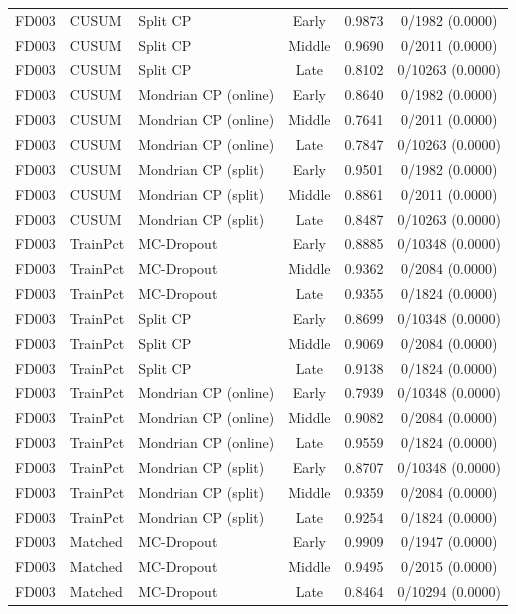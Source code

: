 \begin{table}[t]
\begin{tabular}{lllccc}
FD003 & CUSUM & Split CP & Early & 0.9873 & 0/1982 (0.0000) \\
FD003 & CUSUM & Split CP & Middle & 0.9690 & 0/2011 (0.0000) \\
FD003 & CUSUM & Split CP & Late & 0.8102 & 0/10263 (0.0000) \\
FD003 & CUSUM & Mondrian CP (online) & Early & 0.8640 & 0/1982 (0.0000) \\
FD003 & CUSUM & Mondrian CP (online) & Middle & 0.7641 & 0/2011 (0.0000) \\
FD003 & CUSUM & Mondrian CP (online) & Late & 0.7847 & 0/10263 (0.0000) \\
FD003 & CUSUM & Mondrian CP (split) & Early & 0.9501 & 0/1982 (0.0000) \\
FD003 & CUSUM & Mondrian CP (split) & Middle & 0.8861 & 0/2011 (0.0000) \\
FD003 & CUSUM & Mondrian CP (split) & Late & 0.8487 & 0/10263 (0.0000) \\
FD003 & TrainPct & MC-Dropout & Early & 0.8885 & 0/10348 (0.0000) \\
FD003 & TrainPct & MC-Dropout & Middle & 0.9362 & 0/2084 (0.0000) \\
FD003 & TrainPct & MC-Dropout & Late & 0.9355 & 0/1824 (0.0000) \\
FD003 & TrainPct & Split CP & Early & 0.8699 & 0/10348 (0.0000) \\
FD003 & TrainPct & Split CP & Middle & 0.9069 & 0/2084 (0.0000) \\
FD003 & TrainPct & Split CP & Late & 0.9138 & 0/1824 (0.0000) \\
FD003 & TrainPct & Mondrian CP (online) & Early & 0.7939 & 0/10348 (0.0000) \\
FD003 & TrainPct & Mondrian CP (online) & Middle & 0.9082 & 0/2084 (0.0000) \\
FD003 & TrainPct & Mondrian CP (online) & Late & 0.9559 & 0/1824 (0.0000) \\
FD003 & TrainPct & Mondrian CP (split) & Early & 0.8707 & 0/10348 (0.0000) \\
FD003 & TrainPct & Mondrian CP (split) & Middle & 0.9359 & 0/2084 (0.0000) \\
FD003 & TrainPct & Mondrian CP (split) & Late & 0.9254 & 0/1824 (0.0000) \\
FD003 & Matched & MC-Dropout & Early & 0.9909 & 0/1947 (0.0000) \\
FD003 & Matched & MC-Dropout & Middle & 0.9495 & 0/2015 (0.0000) \\
FD003 & Matched & MC-Dropout & Late & 0.8464 & 0/10294 (0.0000) \\

\end{tabular}
\end{table}
